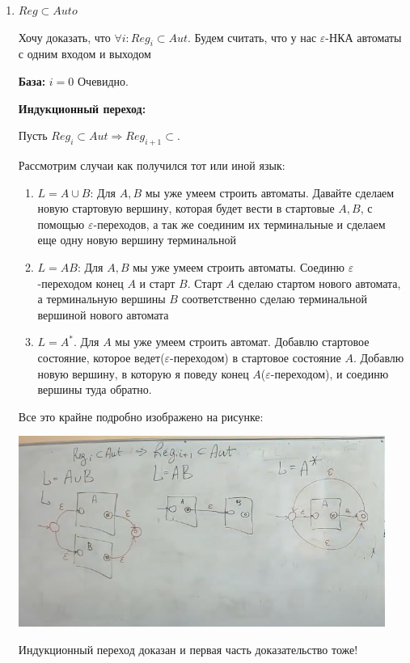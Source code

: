 \begin{enumerate}
    \item $Reg \subset Auto$

    Хочу доказать, что $\forall i: Reg_i \subset Aut$. Будем считать, что у нас $\varepsilon$-НКА автоматы с одним входом и выходом

    \textbf{База:} $i=0$ Очевидно.

    \textbf{Индукционный переход:}

    Пусть $Reg_i \subset Aut \Rightarrow Reg_{i+1}\subset$.

    Рассмотрим случаи как получился тот или иной язык:
    \begin{enumerate}
        \item $L = A \cup B$: Для $A,B$ мы уже умеем строить автоматы. Давайте сделаем новую стартовую вершину, которая будет вести в стартовые $A,B$, с помощью $\varepsilon$-переходов, а так же соединим их терминальные и сделаем еще одну новую вершину терминальной
        \item $L=AB$: Для $A,B$ мы уже умеем строить автоматы. Соединю $\varepsilon$-переходом конец $A$ и старт $B$. Старт $A$ сделаю стартом нового автомата, а терминальную вершины $B$ соответственно сделаю терминальной вершиной нового автомата
        \item $L = A^*$. Для $A$ мы уже умеем строить автомат. Добавлю стартовое состояние, которое ведет($\varepsilon$-переходом) в стартовое состояние $A$. Добавлю новую вершину, в которую я поведу конец $A$($\varepsilon$-переходом), и соединю вершины туда обратно.
    \end{enumerate}    
    Все это крайне подробно изображено на рисунке:
    \begin{center}
    \includegraphics[width = 12cm]{assets/8_2_1.jpg}
\end{center}
    Индукционный переход доказан и первая часть доказательство тоже!

    
\end{enumerate}
